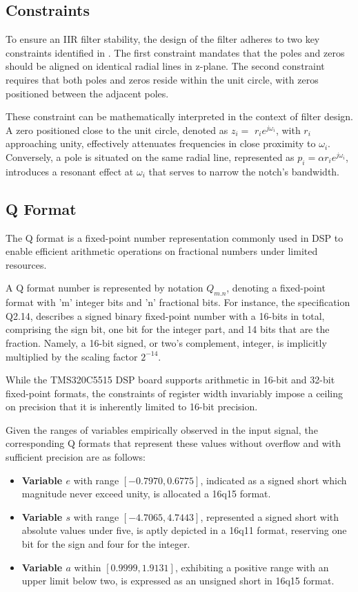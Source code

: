  \subsection{Constraints}
To ensure an IIR filter stability, the design of the filter adheres to two key constraints identified in \cite{vanwaterschoot2014}. The first constraint mandates that the poles and zeros should be aligned on identical radial lines in z-plane. The second constraint requires that both poles and zeros reside within the unit circle, with zeros positioned between the adjacent poles.

These constraint can be mathematically interpreted in the context of filter design. A zero positioned close to the unit circle, denoted as $z_{i}=$ $r_{i} e^{j \omega_{i}}$, with $r_{i}$ approaching unity, effectively attenuates frequencies in close proximity to $\omega_{i}$. Conversely, a pole is situated on the same radial line, represented as $p_{i}=\alpha r_{i} e^{j \omega_{i}}$, introduces a resonant effect at $\omega_{i}$ that  serves to narrow the notch's bandwidth. 

\subsection{Q Format}\label{q_format}
The Q format is a fixed-point number representation commonly used in DSP to enable efficient arithmetic operations on fractional numbers under limited resources. 

A Q format number is represented by notation $Q_{m.n}$, denoting a fixed-point format with 'm' integer bits and 'n' fractional bits. For instance, the specification Q2.14, describes a signed binary fixed-point number with a 16-bits in total, comprising the sign bit, one bit for the integer part, and 14 bits that are the fraction. Namely, a 16-bit signed, or two's complement, integer, is implicitly multiplied by the scaling factor $2^{-14}$.

While the TMS320C5515 DSP board supports arithmetic in 16-bit and 32-bit fixed-point formats, the constraints of register width invariably impose a ceiling on precision that it is inherently limited to 16-bit precision.

Given the ranges of variables empirically observed in the input signal, the corresponding Q formats that represent these values without overflow and with sufficient precision are as follows:

\begin{itemize}
    \item \textbf{Variable $e$} with range \([-0.7970, 0.6775]\), indicated as a signed short which magnitude never exceed unity, is allocated a 16q15 format.
    \item \textbf{Variable $s$} with range \([-4.7065, 4.7443]\), represented a signed short with absolute values under five, is aptly depicted in a 16q11 format, reserving one bit for the sign and four for the integer.
    \item \textbf{Variable $a$} within \([0.9999, 1.9131]\), exhibiting a positive range with an upper limit below two, is expressed as an unsigned short in 16q15 format.
\end{itemize}

